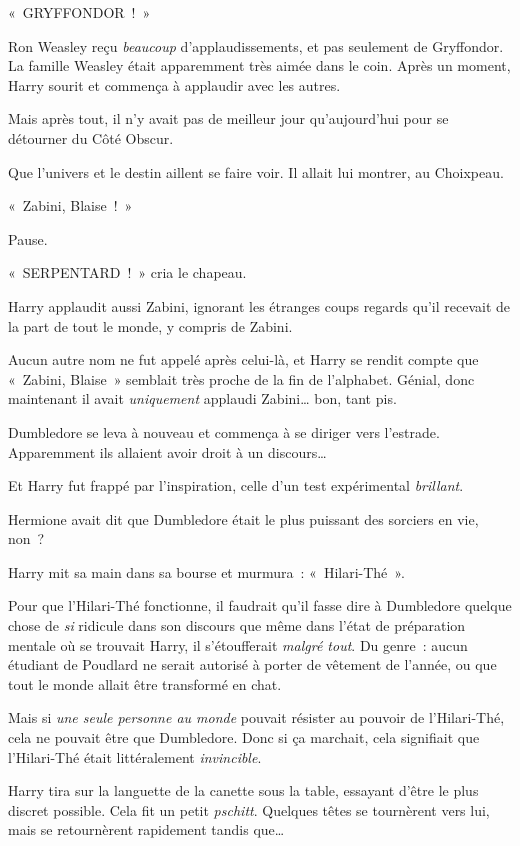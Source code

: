 «~GRYFFONDOR~!~»

Ron Weasley reçu \emph{beaucoup} d'applaudissements, et pas seulement de Gryffondor.
La famille Weasley était apparemment très aimée dans le coin.
Après un moment, Harry sourit et commença à applaudir avec les autres.

Mais après tout, il n'y avait pas de meilleur jour qu'aujourd'hui pour se détourner du Côté Obscur.

Que l'univers et le destin aillent se faire voir.
Il allait lui montrer, au Choixpeau.

«~Zabini, Blaise~!~»

Pause.

«~SERPENTARD~!~» cria le chapeau.

Harry applaudit aussi Zabini, ignorant les étranges coups regards qu'il recevait de la part de tout le monde, y compris de Zabini.

Aucun autre nom ne fut appelé après celui-là, et Harry se rendit compte que «~Zabini, Blaise~» semblait très proche de la fin de l'alphabet.
Génial, donc maintenant il avait \emph{uniquement} applaudi Zabini… bon, tant pis.

Dumbledore se leva à nouveau et commença à se diriger vers l'estrade.
Apparemment ils allaient avoir droit à un discours…

Et Harry fut frappé par l'inspiration, celle d'un test expérimental \emph{brillant}.

Hermione avait dit que Dumbledore était le plus puissant des sorciers en vie, non~?

Harry mit sa main dans sa bourse et murmura~: «~Hilari-Thé~».

Pour que l'Hilari-Thé fonctionne, il faudrait qu'il fasse dire à Dumbledore quelque chose de \emph{si} ridicule dans son discours que même dans l'état de préparation mentale où se trouvait Harry, il s'étoufferait \emph{malgré tout}.
Du genre~: aucun étudiant de Poudlard ne serait autorisé à porter de vêtement de l'année, ou que tout le monde allait être transformé en chat.

Mais si \emph{une seule personne au monde} pouvait résister au pouvoir de l'Hilari-Thé, cela ne pouvait être que Dumbledore.
Donc si ça marchait, cela signifiait que l'Hilari-Thé était littéralement \emph{invincible}.

Harry tira sur la languette de la canette sous la table, essayant d'être le plus discret possible.
Cela fit un petit \emph{pschitt}.
Quelques têtes se tournèrent vers lui, mais se retournèrent rapidement tandis que…

